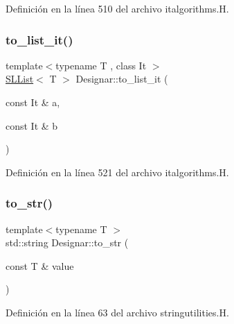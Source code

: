 Definición en la línea 510 del archivo italgorithms.\+H.

\mbox{\label{namespace_designar_a500a98cf132b734b9058abdae7cd2e5d}} 
\subsubsection{\texorpdfstring{to\+\_\+list\+\_\+it()}{to\_list\_it()}}
{\footnotesize\ttfamily template$<$typename T , class It $>$ \\
\hyperlink{class_designar_1_1_s_l_list}{S\+L\+List}$<$ T $>$ Designar\+::to\+\_\+list\+\_\+it (\begin{DoxyParamCaption}\item[{const It \&}]{a,  }\item[{const It \&}]{b }\end{DoxyParamCaption})}



Definición en la línea 521 del archivo italgorithms.\+H.

\mbox{\label{namespace_designar_a3a65054e43d88058112c15679b43c4e4}} 
\subsubsection{\texorpdfstring{to\+\_\+str()}{to\_str()}}
{\footnotesize\ttfamily template$<$typename T $>$ \\
std\+::string Designar\+::to\+\_\+str (\begin{DoxyParamCaption}\item[{const T \&}]{value }\end{DoxyParamCaption})}



Definición en la línea 63 del archivo stringutilities.\+H.

\mbox{\label{namespace_designar_a98d4bef12f5a30df5bf8a1fe56314330}} 
